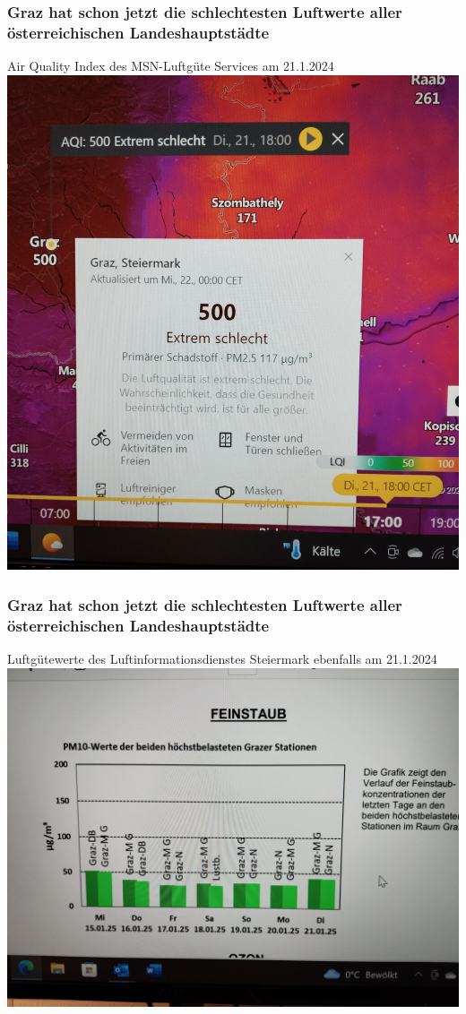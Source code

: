 \documentclass[8pt]{beamer}
\begin{document}
	\begin{frame}[t]
		\frametitle{Graz hat schon jetzt die schlechtesten Luftwerte aller österreichischen Landeshauptstädte} 
		
		Air Quality Index des MSN-Luftgüte Services am 21.1.2024
		\vspace{0.4mm}
		\includegraphics[scale=0.5]{msn.jpg}

	\end{frame}
	
	
	\begin{frame}[t]
		\frametitle{Graz hat schon jetzt die schlechtesten Luftwerte aller österreichischen Landeshauptstädte} 
		
		Luftgütewerte des Luftinformationsdienstes Steiermark ebenfalls am 21.1.2024
		\vspace{0.4mm}
		\includegraphics[scale=0.16]{feinstaub.jpg}

	\end{frame}
\end{document}
